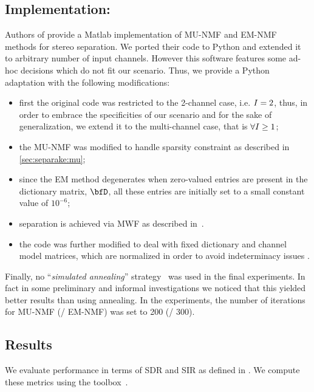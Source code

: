 \subsection{Implementation:}
Authors of  provide a Matlab implementation of \ac{MU}-\ac{NMF} and \ac{EM}-\ac{NMF} methods for stereo separation.
We ported their code to Python and extended it to arbitrary number of input channels.
However this software features some ad-hoc decisions which do not fit our scenario.
Thus, we provide a Python adaptation with the following modifications:
\begin{itemize}
    \item first the original code was restricted to the 2-channel case, i.e.  $I = 2$,
    thus, in order to embrace the specificities of our scenario and for the sake of generalization, we extend it to the multi-channel case, that is $\forall I \geq 1$;
    \item the \ac{MU}-\ac{NMF} was modified to handle sparsity constraint as described in \ref{sec:separake:mu};
    \item since the \ac{EM} method degenerates when zero-valued entries are present in the dictionary matrix, $\mD$, all these entries are initially set to a small constant value of $10^{-6}$;
    \item separation is achieved via \ac{MWF} as described in~.
    \item the code was further modified to deal with fixed dictionary and channel model matrices, which are normalized in order to avoid indeterminacy issues .
\end{itemize}
Finally, no ``\textit{simulated annealing}'' strategy~ was used in the final experiments.
In fact in some preliminary and informal investigations we noticed that this yielded better results than using annealing.
In the experiments, the number of iterations for \ac{MU}-\ac{NMF} (\resp/ \ac{EM}-\ac{NMF}) was set to 200 (\resp/ 300).

\subsection{Results}
\label{sec:results}

We evaluate performance in terms of \ac{SDR} and \ac{SIR} as defined in .
We compute these metrics using the  toolbox~.

